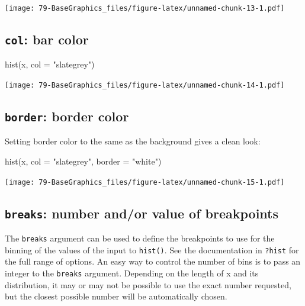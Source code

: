 \documentclass[
]{book}
\newenvironment{Shaded}{\begin{snugshade}}{\end{snugshade}}
\newcommand{\AttributeTok}[1]{\textcolor[rgb]{0.77,0.63,0.00}{#1}}
\newcommand{\FunctionTok}[1]{\textcolor[rgb]{0.00,0.00,0.00}{#1}}
\newcommand{\NormalTok}[1]{#1}
\newcommand{\StringTok}[1]{\textcolor[rgb]{0.31,0.60,0.02}{#1}}
\begin{document}
\texttt{[image: 79-BaseGraphics\_files/figure-latex/unnamed-chunk-13-1.pdf]}

\hypertarget{col-bar-color}{%
\subsection{\texorpdfstring{\textbf{\texttt{col}}: bar color}{col: bar color}}\label{col-bar-color}}

\begin{Shaded}
\begin{Highlighting}[]
\FunctionTok{hist}\NormalTok{(x, }\AttributeTok{col =} \StringTok{"slategrey"}\NormalTok{)}
\end{Highlighting}
\end{Shaded}

\texttt{[image: 79-BaseGraphics\_files/figure-latex/unnamed-chunk-14-1.pdf]}

\hypertarget{border-border-color}{%
\subsection{\texorpdfstring{\textbf{\texttt{border}}: border color}{border: border color}}\label{border-border-color}}

Setting border color to the same as the background gives a clean look:

\begin{Shaded}
\begin{Highlighting}[]
\FunctionTok{hist}\NormalTok{(x, }\AttributeTok{col =} \StringTok{"slategrey"}\NormalTok{, }\AttributeTok{border =} \StringTok{"white"}\NormalTok{)}
\end{Highlighting}
\end{Shaded}

\texttt{[image: 79-BaseGraphics\_files/figure-latex/unnamed-chunk-15-1.pdf]}

\hypertarget{breaks-number-andor-value-of-breakpoints}{%
\subsection{\texorpdfstring{\texttt{breaks}: number and/or value of breakpoints}{breaks: number and/or value of breakpoints}}\label{breaks-number-andor-value-of-breakpoints}}

The \texttt{breaks} argument can be used to define the breakpoints to use for the binning of the values of the input to \texttt{hist()}. See the documentation in \texttt{?hist} for the full range of options. An easy way to control the number of bins is to pass an integer to the \texttt{breaks} argument. Depending on the length of x and its distribution, it may or may not be possible to use the exact number requested, but the closest possible number will be automatically chosen.
\end{document}

